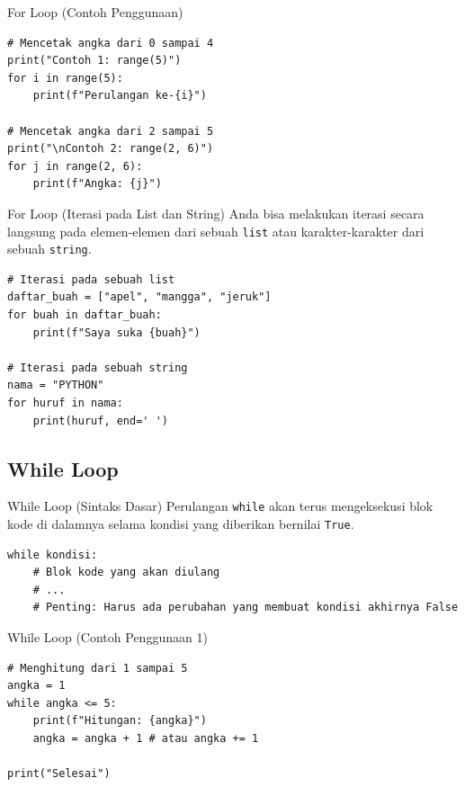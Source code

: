 \documentclass[aspectratio=169, table]{beamer}
\begin{document}
\begin{frame}[fragile]{For Loop (Contoh Penggunaan)}
\begin{lstlisting}[style=PythonStyle, caption={Kode Python: for_with_range.py}]
# Mencetak angka dari 0 sampai 4
print("Contoh 1: range(5)")
for i in range(5):
    print(f"Perulangan ke-{i}")

# Mencetak angka dari 2 sampai 5
print("\nContoh 2: range(2, 6)")
for j in range(2, 6):
    print(f"Angka: {j}")
\end{lstlisting}
\end{frame}

\begin{frame}[fragile]{For Loop (Iterasi pada List dan String)}
Anda bisa melakukan iterasi secara langsung pada elemen-elemen dari sebuah \texttt{list} atau karakter-karakter dari sebuah \texttt{string}.

\begin{lstlisting}[style=PythonStyle, caption={Kode Python: list_and_string_iteration.py}]
# Iterasi pada sebuah list
daftar_buah = ["apel", "mangga", "jeruk"]
for buah in daftar_buah:
    print(f"Saya suka {buah}")

# Iterasi pada sebuah string
nama = "PYTHON"
for huruf in nama:
    print(huruf, end=' ')
\end{lstlisting}
\end{frame}

\subsection{While Loop}
\begin{frame}[fragile]{While Loop (Sintaks Dasar)}
Perulangan \texttt{while} akan terus mengeksekusi blok kode di dalamnya selama kondisi yang diberikan bernilai \texttt{True}.

\begin{lstlisting}[style=PythonStyle, caption={Sintaks Dasar Perulangan while}]
while kondisi:
    # Blok kode yang akan diulang
    # ...
    # Penting: Harus ada perubahan yang membuat kondisi akhirnya False
\end{lstlisting}
\end{frame}

\begin{frame}[fragile]{While Loop (Contoh Penggunaan 1)}
\begin{lstlisting}[style=PythonStyle, caption={Kode Python: while_loop.py}]
# Menghitung dari 1 sampai 5
angka = 1
while angka <= 5:
    print(f"Hitungan: {angka}")
    angka = angka + 1 # atau angka += 1

print("Selesai")
\end{lstlisting}
\end{frame}
\end{document}
